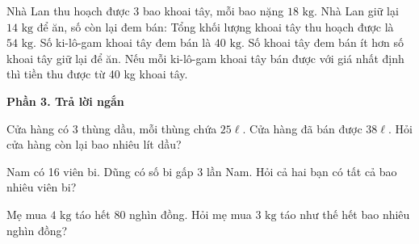 \begin{ex} %
Nhà Lan thu hoạch được 3 bao khoai tây, mỗi bao nặng $18\text{ kg}$. Nhà Lan giữ lại $14\text{ kg}$ để ăn, số còn lại đem bán:
\choiceTF
{\True Tổng khối lượng khoai tây thu hoạch được là $54\text{ kg}$.}
{\True Số ki-lô-gam khoai tây đem bán là $40\text{ kg}$.}
{Số khoai tây đem bán ít hơn số khoai tây giữ lại để ăn.}
{\True Nếu mỗi ki-lô-gam khoai tây bán được với giá nhất định thì tiền thu được từ 40 kg khoai tây.}
\end{ex}

\textbf{Phần 3. Trả lời ngắn}

\begin{ex} %
Cửa hàng có 3 thùng dầu, mỗi thùng chứa $25\ell$. Cửa hàng đã bán được $38\ell$. Hỏi cửa hàng còn lại bao nhiêu lít dầu?
\end{ex}

\begin{ex} %
Nam có 16 viên bi. Dũng có số bi gấp 3 lần Nam. Hỏi cả hai bạn có tất cả bao nhiêu viên bi?
\end{ex}

\begin{ex} %
Mẹ mua $4\text{ kg}$ táo hết 80 nghìn đồng. Hỏi mẹ mua $3\text{ kg}$ táo như thế hết bao nhiêu nghìn đồng?
\end{ex}


